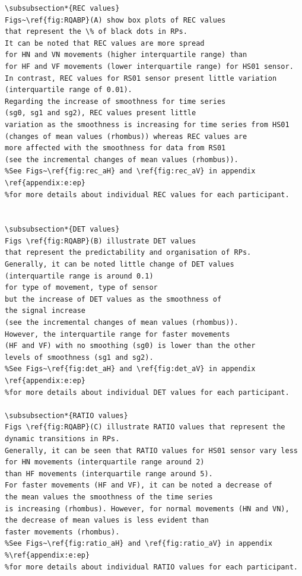 \documentclass[10pt]{article}
\begin{document}
\begin{verbatim}
\subsubsection*{REC values}
Figs~\ref{fig:RQABP}(A) show box plots of REC values 
that represent the \% of black dots in RPs.
It can be noted that REC values are more spread 
for HN and VN movements (higher interquartile range) than 
for HF and VF movements (lower interquartile range) for HS01 sensor. 
In contrast, REC values for RS01 sensor present little variation 
(interquartile range of 0.01).
Regarding the increase of smoothness for time series 
(sg0, sg1 and sg2), REC values present little 
variation as the smoothness is increasing for time series from HS01 
(changes of mean values (rhombus)) whereas REC values are 
more affected with the smoothness for data from RS01 
(see the incremental changes of mean values (rhombus)).
%See Figs~\ref{fig:rec_aH} and \ref{fig:rec_aV} in appendix \ref{appendix:e:ep} 
%for more details about individual REC values for each participant.


\subsubsection*{DET values}
Figs \ref{fig:RQABP}(B) illustrate DET values 
that represent the predictability and organisation of RPs.
Generally, it can be noted little change of DET values 
(interquartile range is around 0.1) 
for type of movement, type of sensor 
but the increase of DET values as the smoothness of 
the signal increase 
(see the incremental changes of mean values (rhombus)).
However, the interquartile range for faster movements
(HF and VF) with no smoothing (sg0) is lower than the other
levels of smoothness (sg1 and sg2).
%See Figs~\ref{fig:det_aH} and \ref{fig:det_aV} in appendix \ref{appendix:e:ep} 
%for more details about individual DET values for each participant.

\subsubsection*{RATIO values}
Figs \ref{fig:RQABP}(C) illustrate RATIO values that represent the 
dynamic transitions in RPs. 
Generally, it can be seen that RATIO values for HS01 sensor vary less 
for HN movements (interquartile range around 2)
than HF movements (interquartile range around 5).
For faster movements (HF and VF), it can be noted a decrease of 
the mean values the smoothness of the time series 
is increasing (rhombus). However, for normal movements (HN and VN), 
the decrease of mean values is less evident than 
faster movements (rhombus).
%See Figs~\ref{fig:ratio_aH} and \ref{fig:ratio_aV} in appendix 
%\ref{appendix:e:ep} 
%for more details about individual RATIO values for each participant.



\end{verbatim}
\end{document}
